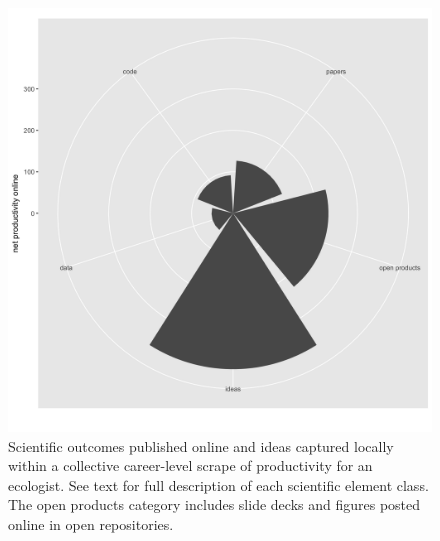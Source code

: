\documentclass[]{elsarticle} %
\makeatletter
\def\maxwidth{\ifdim\Gin@nat@width>\linewidth\linewidth
\else\Gin@nat@width\fi}
\let\Oldincludegraphics\includegraphics
\renewcommand{\includegraphics}[1]{\Oldincludegraphics[width=\maxwidth]{#1}}
\makeatother
\begin{document}
\begin{figure}
\centering
\includegraphics{./fig1.png}
\caption{Scientific outcomes published online and ideas captured locally
within a collective career-level scrape of productivity for an
ecologist. See text for full description of each scientific element
class. The open products category includes slide decks and figures
posted online in open repositories.}
\end{figure}
\end{document}

